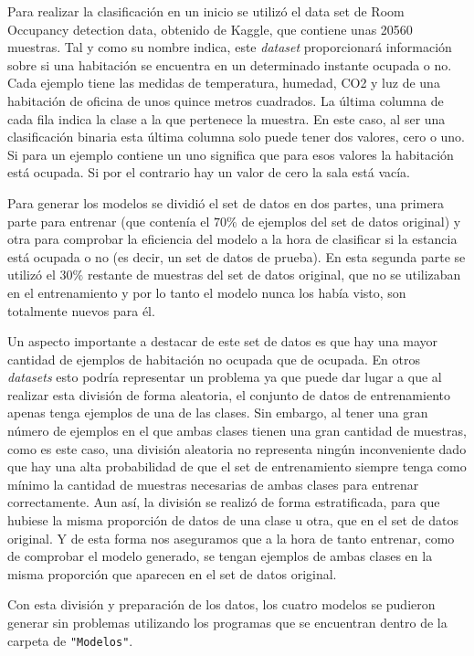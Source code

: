 \documentclass[a4paper, 12pt]{book}
\begin{document}
Para realizar la clasificación en un inicio se utilizó el data set de Room Occupancy detection data\cite{DataSetOccupancy}, obtenido de Kaggle, que contiene unas 20560 muestras. Tal y como su nombre indica, este \textit{dataset} proporcionará información sobre si una habitación se encuentra en un determinado instante ocupada o no. Cada ejemplo tiene las medidas de temperatura, humedad, CO2 y luz de una habitación de oficina de unos quince metros cuadrados. La última columna de cada fila indica la clase a la que pertenece la muestra. En este caso, al ser una clasificación binaria esta última columna solo puede tener dos valores, cero o uno. Si para un ejemplo contiene un uno significa que para esos valores la habitación está ocupada. Si por el contrario hay un valor de cero la sala está vacía. 

Para generar los modelos se dividió el set de datos en dos partes, una primera parte para entrenar (que contenía el $70\%$ de ejemplos del set de datos original) y otra para comprobar la eficiencia del modelo a la hora de clasificar si la estancia está ocupada o no (es decir, un set de datos de prueba). En esta segunda parte se utilizó el $30\%$ restante de muestras del set de datos original, que no se utilizaban en el entrenamiento y por lo tanto el modelo nunca los había visto, son totalmente nuevos para él.

Un aspecto importante a destacar de este set de datos es que hay una mayor cantidad de ejemplos de habitación no ocupada que de ocupada. En otros \textit{datasets} esto podría representar un problema ya que puede dar lugar a que al realizar esta división de forma aleatoria, el conjunto de datos de entrenamiento apenas tenga ejemplos de una de las clases. Sin embargo, al tener una gran número de ejemplos en el que ambas clases tienen una gran cantidad de muestras, como es este caso, una división aleatoria no representa ningún inconveniente dado que hay una alta probabilidad de que el set de entrenamiento siempre tenga como mínimo la cantidad de muestras necesarias de ambas clases para entrenar correctamente. Aun así, la división se realizó de forma estratificada, para que hubiese la misma proporción de datos de una clase u otra, que en el set de datos original. Y de esta forma nos aseguramos que a la hora de tanto entrenar, como de comprobar el modelo generado, se tengan ejemplos de ambas clases en la misma proporción que aparecen en el set de datos original.

Con esta división y preparación de los datos, los cuatro modelos se pudieron generar sin problemas utilizando los programas que se encuentran dentro de la carpeta de \texttt{"Modelos"}.  
\end{document}
